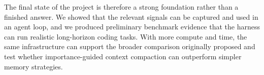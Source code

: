 \documentclass[11pt]{article}
\begin{document}
The final state of the project is therefore a strong foundation rather than a
finished answer. We showed that the relevant signals can be captured and used in
an agent loop, and we produced preliminary benchmark evidence that the harness
can run realistic long-horizon coding tasks. With more compute and time, the same
infrastructure can support the broader comparison originally proposed and test
whether importance-guided context compaction can outperform simpler memory
strategies.
\end{document}
